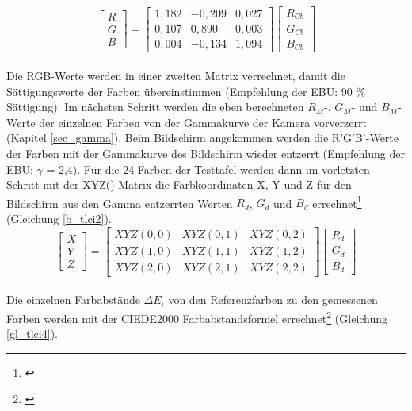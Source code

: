 \begin{equation}\label{gl_tlci1}
\begin{bmatrix} R \\ G \\ B \end{bmatrix}= 
\begin{bmatrix} 1,182 & -0,209 & 0,027 \\ 0,107 & 0,890 & 0,003 \\ 0,004 & -0,134 & 1,094 \end{bmatrix}
\begin{bmatrix} R_{Cb} \\ G_{Cb} \\ B_{Cb} \end{bmatrix}
\end{equation}\\
Die RGB-Werte werden in einer zweiten Matrix verrechnet, damit die Sättigungswerte der Farben übereinstimmen (Empfehlung der EBU: 90 \% Sättigung). Im nächsten Schritt werden die eben berechneten $R_{M}$-, $G_{M}$- und $B_{M}$-Werte der einzelnen Farben von der Gammakurve der Kamera vorverzerrt (Kapitel \ref{sec_gamma}).
Beim Bildschirm angekommen werden die R'G'B'-Werte der Farben mit der Gammakurve des Bildschirm wieder entzerrt (Empfehlung der EBU: $\gamma$ = 2,4). Für die 24 Farben der Testtafel werden dann im vorletzten Schritt mit der XYZ()-Matrix die Farbkoordinaten X, Y und Z für den Bildschirm aus den Gamma entzerrten Werten  $R_{d}$, $G_{d}$ und $B_{d}$ errechnet\footnote{\cite[17]{roberts}} (Gleichung \ref{b_tlci2}).
\begin{equation}\label{gl_tlci2}
\begin{bmatrix} X \\ Y \\ Z \end{bmatrix}= 
\begin{bmatrix} XYZ(0,0) & XYZ(0,1) & XYZ(0,2) \\ XYZ(1,0) & XYZ(1,1) & XYZ(1,2) \\ XYZ(2,0) & XYZ(2,1) & XYZ(2,2) \end{bmatrix}
\begin{bmatrix} R_{d} \\ G_{d} \\ B_{d} \end{bmatrix}
\end{equation}\\
Die einzelnen Farbabstände $\Delta E_{i}$ von den Referenzfarben zu den gemessenen Farben werden mit der CIEDE2000 Farbabstandsformel errechnet\footnote{\cite[3]{sharwu}} (Gleichung \ref{gl_tlci4}).

